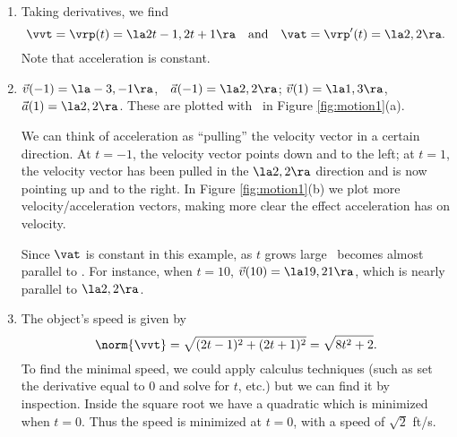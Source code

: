 {\begin{enumerate}
	\item Taking derivatives, we find
	$$\vvt = \vrp(t) =\la 2t-1,2t+1\ra \quad \text{and} \quad \vat = \vrp'(t) = \la 2,2\ra.$$
	Note that acceleration is constant.
	
	\item		$\vec v(-1) = \la -3,-1\ra$,\ \ $\vec a(-1) = \la 2,2\ra$; \quad $\vec v(1) = \la 1,3\ra$,\ \ $\vec a(1) = \la 2,2\ra$. These are plotted with \vrt\ in Figure \ref{fig:motion1}(a).
	
	We can think of acceleration as ``pulling'' the velocity vector in a certain direction. At $t=-1$, the velocity vector points down and to the left; at $t=1$, the velocity vector has been pulled in the $\la 2,2\ra$ direction and is now pointing up and to the right. In Figure \ref{fig:motion1}(b) we plot more velocity/acceleration vectors, making more clear the effect acceleration has on velocity.
	
	Since $\vat$ is constant in this example, as $t$ grows large \vvt\ becomes almost parallel to \vat. For instance, when $t=10$, $\vec v(10) = \la 19,21\ra$, which is nearly parallel to $\la 2,2\ra$.
	
	\item		The object's speed is given by 
	$$\norm{\vvt} = \sqrt{(2t-1)^2+(2t+1)^2} =\sqrt{8t^2+2}.$$ To find the minimal speed, we could apply calculus techniques (such as set the derivative equal to 0 and solve for $t$, etc.) but we can find it by inspection. Inside the square root we have a quadratic which is minimized when $t=0$. Thus the speed is minimized at $t=0$, with a speed of $\sqrt{2}$ ft/s.
	

\end{enumerate}}

